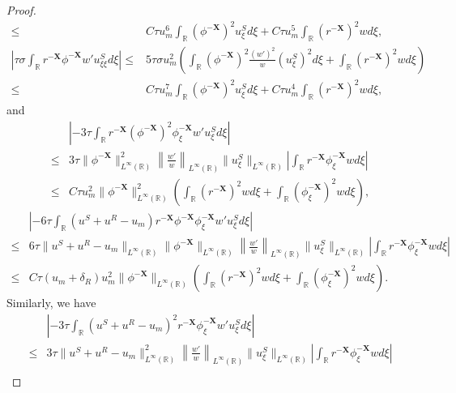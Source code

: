 \documentclass[10pt,reqno]{amsart}
\numberwithin{equation}{section}
\begin{document}
\begin{proof}
\begin{align*}
			\leq&C\tau u_m^6\int_{\mathbb{R}}(\phi^{-\mathbf{X}})^2u_{\xi}^Sd\xi+C\tau u_m^5\int_{\mathbb{R}}(r^{-\mathbf{X}})^2wd\xi,\\
			\left|\tau\sigma\int_{\mathbb{R}}r^{-\mathbf{X}}\phi^{-\mathbf{X}}w'u^S_{\xi\xi}d\xi\right|\leq&5\tau\sigma u_m^2\left(\int_{\mathbb{R}}(\phi^{-\mathbf{X}})^2\frac{(w')^2}{w}(u^S_{\xi})^2d\xi+\int_{\mathbb{R}}(r^{-\mathbf{X}})^2wd\xi\right)\\
			\leq&C\tau u_m^7\int_{\mathbb{R}}(\phi^{-\mathbf{X}})^2u^S_{\xi}d\xi+C\tau u_m^4\int_{\mathbb{R}}(r^{-\mathbf{X}})^2wd\xi,
		\end{align*}
		and
		\begin{align*}
			&\left|-3\tau\int_{\mathbb{R}}r^{-\mathbf{X}}(\phi^{-\mathbf{X}})^{2}\phi_{\xi}^{-\mathbf{X}}w'u_{\xi}^{S}d\xi\right|\\
			\leq&3\tau\lVert\phi^{-\mathbf{X}}\rVert_{L^{\infty}(\mathbb{R})}^2\left\lVert\frac{w'}{w}\right\rVert_{L^{\infty}(\mathbb{R})}\|u_{\xi}^S\|_{L^{\infty}(\mathbb{R})}\left|\int_{\mathbb{R}}r^{-\mathbf{X}}\phi_{\xi}^{-\mathbf{X}}wd\xi\right|\\
			\leq&C\tau u_m^2\lVert\phi^{-\mathbf{X}}\rVert_{L^{\infty}(\mathbb{R})}^2\left(\int_{\mathbb{R}}(r^{-\mathbf{X}})^2wd\xi+\int_{\mathbb{R}}(\phi_{\xi}^{-\mathbf{X}})^2wd\xi\right),
			\end{align*}
			\begin{align*}
			&\left|-6\tau\int_{\mathbb{R}}(u^{S}+u^{R}-u_{m})r^{-\mathbf{X}}\phi^{-\mathbf{X}}\phi_{\xi}^{-\mathbf{X}}w'u_{\xi}^{S}d\xi\right|\\
			\leq&6\tau\lVert u^S+u^R-u_m\rVert_{L^{\infty}(\mathbb{R})}\lVert\phi^{-\mathbf{X}}\rVert_{L^{\infty}(\mathbb{R})}\left\lVert\frac{w'}{w}\right\rVert_{L^{\infty}(\mathbb{R})}\|u_{\xi}^S\|_{L^{\infty}(\mathbb{R})}\left|\int_{\mathbb{R}}r^{-\mathbf{X}}\phi_{\xi}^{-\mathbf{X}}wd\xi\right|\\
			\leq&C\tau(u_m+\delta_R)u_m^2\lVert\phi^{-\mathbf{X}}\rVert_{L^{\infty}(\mathbb{R})}\left(\int_{\mathbb{R}}(r^{-\mathbf{X}})^2wd\xi+\int_{\mathbb{R}}(\phi_{\xi}^{-\mathbf{X}})^2wd\xi\right).
		\end{align*}
		Similarly, we have
		\begin{align*}
			&\left|-3\tau\int_{\mathbb{R}}(u^{S}+u^{R}-u_{m})^{2}r^{-\mathbf{X}}\phi_{\xi}^{-\mathbf{X}}w'u_{\xi}^{S}d\xi\right|\\
			\leq&3\tau\lVert u^S+u^R-u_m\rVert_{L^{\infty}(\mathbb{R})}^2\left\lVert\frac{w'}{w}\right\rVert_{L^{\infty}(\mathbb{R})}\|u_{\xi}^S\|_{L^{\infty}(\mathbb{R})}\left|\int_{\mathbb{R}}r^{-\mathbf{X}}\phi_{\xi}^{-\mathbf{X}}wd\xi\right|\\

\end{align*}
\end{proof}
\end{document}
